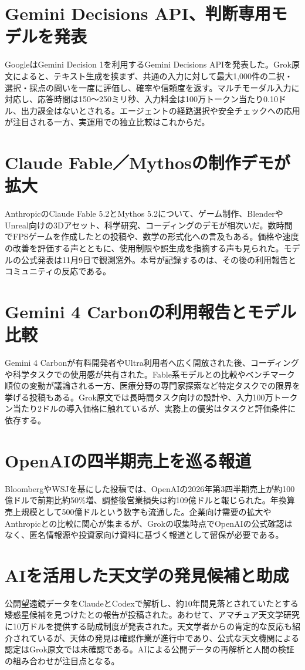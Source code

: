 \section{Gemini Decisions API、判断専用モデルを発表}
GoogleはGemini Decision 1を利用するGemini Decisions APIを発表した。Grok原文によると、テキスト生成を挟まず、共通の入力に対して最大1,000件の二択・選択・採点の問いを一度に評価し、確率や信頼度を返す。マルチモーダル入力に対応し、応答時間は150～250ミリ秒、入力料金は100万トークン当たり0.10ドル、出力課金はないとされる。エージェントの経路選択や安全チェックへの応用が注目される一方、実運用での独立比較はこれからだ。

\section{Claude Fable／Mythosの制作デモが拡大}
AnthropicのClaude Fable 5.2とMythos 5.2について、ゲーム制作、BlenderやUnreal向けの3Dアセット、科学研究、コーディングのデモが相次いだ。数時間でFPSゲームを作成したとの投稿や、数学の形式化への言及もある。価格や速度の改善を評価する声とともに、使用制限や誤生成を指摘する声も見られた。モデルの公式発表は11月9日で観測窓外。本号が記録するのは、その後の利用報告とコミュニティの反応である。

\section{Gemini 4 Carbonの利用報告とモデル比較}
Gemini 4 Carbonが有料開発者やUltra利用者へ広く開放された後、コーディングや科学タスクでの使用感が共有された。Fable系モデルとの比較やベンチマーク順位の変動が議論される一方、医療分野の専門家探索など特定タスクでの限界を挙げる投稿もある。Grok原文では長時間タスク向けの設計や、入力100万トークン当たり2ドルの導入価格に触れているが、実務上の優劣はタスクと評価条件に依存する。

\section{OpenAIの四半期売上を巡る報道}
BloombergやWSJを基にした投稿では、OpenAIの2026年第3四半期売上が約100億ドルで前期比約50\%増、調整後営業損失は約109億ドルと報じられた。年換算売上規模として500億ドルという数字も流通した。企業向け需要の拡大やAnthropicとの比較に関心が集まるが、Grokの収集時点でOpenAIの公式確認はなく、匿名情報源や投資家向け資料に基づく報道として留保が必要である。

\section{AIを活用した天文学の発見候補と助成}
公開望遠鏡データをClaudeとCodexで解析し、約10年間見落とされていたとする矮惑星候補を見つけたとの報告が投稿された。あわせて、アマチュア天文学研究に10万ドルを提供する助成制度が発表された。天文学者からの肯定的な反応も紹介されているが、天体の発見は確認作業が進行中であり、公式な天文機関による認定はGrok原文では未確認である。AIによる公開データの再解析と人間の検証の組み合わせが注目点となる。

